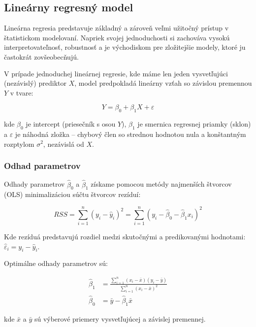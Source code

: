 \subsection{Lineárny regresný model}
\label{subsec:linear_regression}

Lineárna regresia predstavuje základný a zároveň veľmi užitočný prístup v štatistickom modelovaní. Napriek svojej jednoduchosti si zachováva vysokú interpretovateľnosť, robustnosť a je východiskom pre zložitejšie modely, ktoré ju častokrát zovšeobecňujú.

V prípade jednoduchej lineárnej regresie, kde máme len jeden vysvetľujúci (nezávislý) prediktor $X$, model predpokladá lineárny vzťah so závislou premennou $Y$ v tvare:

\begin{equation}
Y = \beta_0 + \beta_1 X + \varepsilon
\end{equation}

kde $\beta_0$ je intercept (priesečník s osou $Y$), $\beta_1$ je smernica regresnej priamky (sklon) a $\varepsilon$ je náhodná zložka – chybový člen so strednou hodnotou nula a konštantným rozptylom $\sigma^2$, nezávislá od $X$.

\subsubsection{Odhad parametrov}

Odhady parametrov $\hat{\beta}_0$ a $\hat{\beta}_1$ získame pomocou metódy najmenších štvorcov (OLS) minimalizáciou súčtu štvorcov rezíduí:

\begin{equation}
RSS = \sum_{i=1}^{n} \left( y_i - \hat{y}_i \right)^2 = \sum_{i=1}^{n} \left( y_i - \hat{\beta}_0 - \hat{\beta}_1 x_i \right)^2
\end{equation}

Kde rezíduá predstavujú rozdiel medzi skutočnými a predikovanými hodnotami: $\hat{\varepsilon}_i = y_i - \hat{y}_i$.

Optimálne odhady parametrov sú:

\begin{align}
\hat{\beta}_1 &= \frac{\sum_{i=1}^{n}(x_i - \bar{x})(y_i - \bar{y})}{\sum_{i=1}^{n}(x_i - \bar{x})^2} \\
\hat{\beta}_0 &= \bar{y} - \hat{\beta}_1 \bar{x}
\end{align}

kde $\bar{x}$ a $\bar{y}$ sú výberové priemery vysvetľujúcej a závislej premennej.

